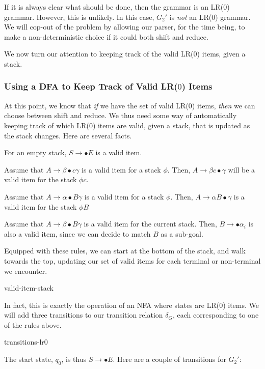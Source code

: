 If it is always clear what should be done, then the grammar is an LR($0$) grammar. However, this is unlikely. In this case, $G_2'$ is \textit{not} an LR($0$) grammar. We will cop-out of the problem by allowing our parser, for the time being, to make a non-deterministic choice if it could both shift and reduce.

We now turn our attention to keeping track of the valid LR($0$) items, given a stack.

\subsubsection{Using a DFA to Keep Track of Valid LR($0$) Items}
At this point, we know that \textit{if} we have the set of valid LR($0$) items, \textit{then} we can choose between shift and reduce. We thus need some way of automatically keeping track of which LR($0$) items are valid, given a stack, that is updated as the stack changes. Here are several facts. 

For an empty stack, $S \to \bullet E$ is a valid item.

Assume that $A \to \beta \bullet c\gamma$ is a valid item for a stack $\phi$. Then, $A \to \beta c\bullet\gamma$ will be a valid item for the stack $\phi c$.

Assume that $A \to \alpha \bullet B \gamma$ is a valid item for a stack $\phi$. Then, $A \to \alpha B \bullet\gamma$ is a valid item for the stack $\phi B$

Assume that $A \to \beta \bullet B \gamma$ is a valid item for the current stack. Then, $B \rightarrow \bullet \alpha_i$ is also a valid item, since we can decide to match $B$ as a sub-goal.

Equipped with these rules, we can start at the bottom of the stack, and walk towards the top, updating our set of valid items for each terminal or non-terminal we encounter. 

\begin{center}
    {valid-item-stack}
\end{center}

In fact, this is exactly the operation of an NFA where states are LR($0$) items. We will add three transitions to our transition relation $\delta_G$, each corresponding to one of the rules above.

\begin{center}
    {transitions-lr0}
\end{center}

The start state, $q_0$, is thus $S \to \bullet E$. Here are a couple of transitions for $G_2'$:

